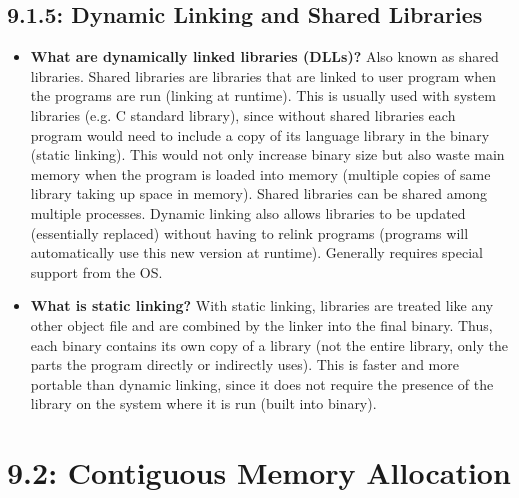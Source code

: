 \documentclass[12pt]{article}
\begin{document}
\subsection*{9.1.5: Dynamic Linking and Shared Libraries}

\begin{itemize}
    \item \textbf{What are dynamically linked libraries (DLLs)?} Also known as shared libraries. Shared libraries are libraries that are linked to user program when the programs are run (linking at runtime). This is usually used with system libraries (e.g. C standard library), since without shared libraries each program would need to include a copy of its language library in the binary (static linking). This would not only increase binary size but also waste main memory when the program is loaded into memory (multiple copies of same library taking up space in memory). Shared libraries can be shared among multiple processes. Dynamic linking also allows libraries to be updated (essentially replaced) without having to relink programs (programs will automatically use this new version at runtime). Generally requires special support from the OS.
    \item \textbf{What is static linking?} With static linking, libraries are treated like any other object file and are combined by the linker into the final binary. Thus, each binary contains its own copy of a library (not the entire library, only the parts the program directly or indirectly uses). This is faster and more portable than dynamic linking, since it does not require the presence of the library on the system where it is run (built into binary).
\end{itemize}

\section*{9.2: Contiguous Memory Allocation}
\end{document}
